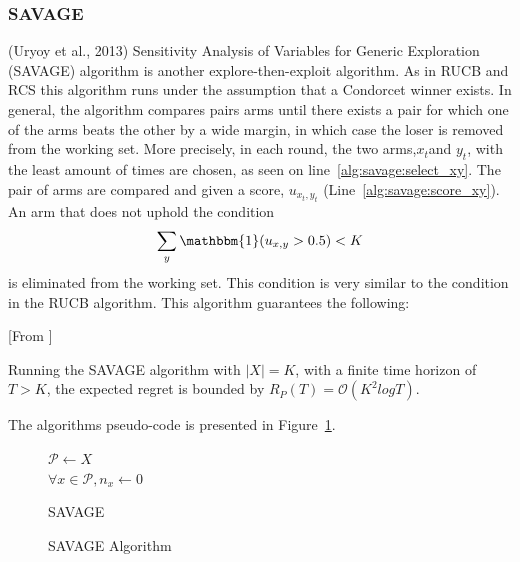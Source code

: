 \documentclass{llncs}
\begin{document}
	\newpage
	
	
	
\subsubsection{SAVAGE}
	(Uryoy et al., 2013) Sensitivity Analysis of Variables for Generic Exploration (SAVAGE) algorithm is another explore-then-exploit algorithm.
	As in RUCB and RCS this algorithm runs under the assumption that a Condorcet winner exists.
	In general, the algorithm compares  pairs arms until there exists a pair for which one of the arms beats the other by a wide margin, in which case the loser is removed from the working set.
	More precisely, in each round, the two arms,$x_t$and $y_t$, with the least amount of times are chosen, as seen on line~\ref{alg:savage:select_xy}.
	The pair of arms are compared and given a score, $u_{x_t, y_t}$ (Line~\ref{alg:savage:score_xy}).
	An arm that does not uphold the condition
	$$ \sum_{y}\mathbbm{1}(u_{x,y} > 0.5) < K $$
	is eliminated from the working set.
	This condition is very similar to the condition in the RUCB algorithm.
	This algorithm guarantees the following:
	\begin{theorem}\label{thm:SAVAGE}[From \cite{...}]

		Running the SAVAGE algorithm with $|X|=K$, with a finite time horizon of $T>K$, the expected regret is bounded by $R_P(T) = \mathcal{O} \left( K^2 log T \right)$.

	\end{theorem}
	The algorithms pseudo-code is presented in Figure~\ref{algo_SAVAGE}.
\begin{figure}[h]
	\IncMargin{1em}
		\begin{algorithm}[H]
		
			$ \mathcal{P} \leftarrow X $\\
			$ \forall x \in \mathcal{P} , n_x \leftarrow 0 $\\
		\BlankLine
			\caption{SAVAGE}
		\end{algorithm}
		\caption{SAVAGE Algorithm}\label{algo_SAVAGE}
	\end{figure}
	\newpage
\end{document}
